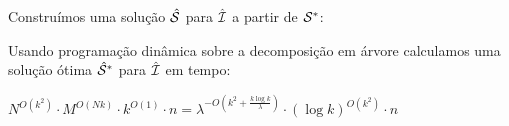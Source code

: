 \begin{frame}{}
    \centering
    Construímos uma solução {\color{red} $\hat {\mathcal{S}}$} para $\hat {\mathcal{I}}$ a partir de {\color{blue} $\mathcal{S}^*$}:

    \begin{minipage}{\linewidth}
        \vspace*{2cm}
        \centering
    \end{minipage}
\end{frame}

\begin{frame}{}
    Usando programação dinâmica sobre a decomposição em árvore calculamos uma solução ótima $\hat {\mathcal{S}}^*$ para $\hat{\mathcal{I}}$ em tempo:

    \bigskip
    \centering
    $N^{O(k^2)}\cdot M^{O(Nk)}\cdot k^{O(1)} \cdot n = \lambda^{-O(k^2+\frac{k\log k}{\lambda})}\cdot (\log k)^{O(k^2)}\cdot n$
\end{frame}

